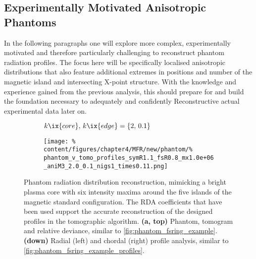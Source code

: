         \subsection{Experimentally Motivated Anisotropic Phantoms}\label{subsec:phantoms_expani}%
%
            In the following paragraphs one will explore more complex, experimentally motivated and therefore particularly challenging to reconstruct phantom radiation profiles. The focus here will be specifically localised anisotropic distributions that also feature additional extremes in positions and number of the magnetic island and intersecting X-point structure. With the knowledge and experience gained from the previous analysis, this should prepare for and build the foundation necessary to adequately and confidently Reconstructive actual experimental data later on.\\%
%
            \begin{figure}[t]%
                \centering%
                \begin{subfigure}{\textwidth}%
                    \centering%
                    \caption{$k\ix{core},\,k\ix{edge}=\left\{2,\,0.1\right\}$}
                \end{subfigure}%
                \newline%
                \begin{subfigure}{\textwidth}%
                    \centering%
                    \texttt{[image: \%
                        content/figures/chapter4/MFR/new/phantom/\%
                        phantom\_v\_tomo\_profiles\_symR1.1\_fsR0.8\_mx1.0e+06\_aniM3\_2.0\_0.1\_nigs1\_times0.11.png]}%
                \end{subfigure}%
                \caption{Phantom radiation distribution reconstruction, mimicking a bright plasma core with six intensity maxima around the five islands of the magnetic standard configuration. The RDA coefficients that have been used support the accurate reconstruction of the designed profiles in the tomographic algorithm. \textbf{(a, top)} Phantom, tomogram and relative deviance, similar to \cref{fig:phantom_fsring_example}. \textbf{(down)} Radial (left) and chordal (right) profile analysis, similar to \cref{fig:phantom_fsring_example_profiles}.}\label{fig:phantom_islands_6_fsring_ani3}%
            \end{figure}%

